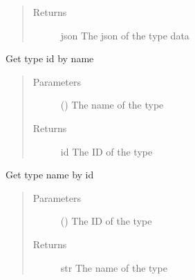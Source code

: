 \documentclass[letterpaper,10pt,english]{sphinxmanual}
\begin{document}
\begin{fulllineitems}
\begin{fulllineitems}
\begin{quote}
\begin{description}
\item[{Returns}] \leavevmode
\sphinxAtStartPar
json \textendash{} The json of the type data

\end{description}\end{quote}

\end{fulllineitems}


\begin{fulllineitems}
\label{\detokenize{index:Api.Api.get_type_id_by_name}}
\sphinxAtStartPar
Get type id by name
\begin{quote}\begin{description}
\item[{Parameters}] \leavevmode
\sphinxAtStartPar
{} () \textendash{} The name of the type

\item[{Returns}] \leavevmode
\sphinxAtStartPar
id \textendash{} The ID of the type

\end{description}\end{quote}

\end{fulllineitems}


\begin{fulllineitems}
\label{\detokenize{index:Api.Api.get_type_name_by_id}}
\sphinxAtStartPar
Get type name by id
\begin{quote}\begin{description}
\item[{Parameters}] \leavevmode
\sphinxAtStartPar
{} () \textendash{} The ID of the type

\item[{Returns}] \leavevmode
\sphinxAtStartPar
str \textendash{} The name of the type


\end{description}
\end{quote}
\end{fulllineitems}
\end{fulllineitems}
\end{document}
